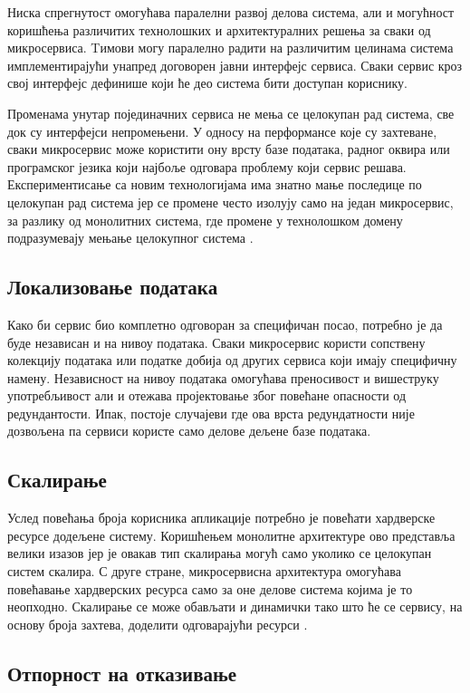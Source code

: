 \documentclass[12pt,oneside]{memoir}
\begin{document}
Ниска спрегнутост омогућава паралелни развој делова система, али и могућност коришћења различитих технолошких и архитектуралних решења за сваки од микросервиса. Tимови могу паралелно радити на различитим целинама система имплементирајући унапред договорен јавни интерфејс сервиса. Сваки сервис кроз свој интерфејс дефинише који ће део система бити доступан кориснику.

Променама унутар појединачних сервиса не мења се целокупан рад система, све док су интерфејси непромењени. У односу на перформансе које су захтеване, сваки микросервис може користити ону врсту базе података, радног оквира или програмског језика који најбоље одговара проблему који сервис решава. Експериментисање са новим технологијама има знатно мање последице по целокупан рад система јер се промене често изолују само на један микросервис, за разлику од монолитних система, где промене у технолошком домену подразумевају мењање целокупног система \cite{microservicesBook}.


\subsection{Локализовање података}

Како би сервис био комплетно одговоран за специфичан посао, потребно је да буде независан и на нивоу података. Сваки микросервис користи сопствену колекцију података или податке добија од других сервиса који имају специфичну намену. Независност на нивоу података омогућава преносивост и вишеструку употребљивост али и отежава пројектовање због повећане опасности од редундантости. Ипак, постоје случајеви где ова врста редундатности није дозвољена па сервиси користе само делове дељене базе података.


\subsection{Скалирање}

Услед повећања броја корисника апликације потребно је повећати хардверске ресурсе додељене систему. Коришћењем монолитне архитектуре ово представља велики изазов јер је овакав тип скалирања могућ само уколико се целокупан систем скалира. С друге стране, микросервисна архитектура омогућава повећавање хардверских ресурса само за оне делове система којима је то неопходно. Скалирање се може обављати и динамички тако што ће се сервису, на основу броја захтева, доделити одговарајући ресурси \cite{microservicesBook}.


\subsection{Отпорност на отказивање}
\end{document}
